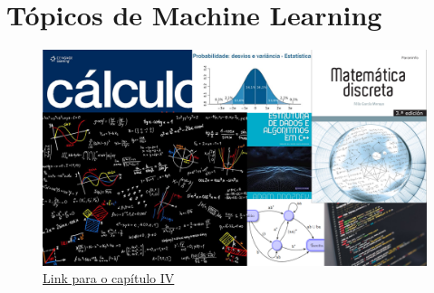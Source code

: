 \documentclass{beamer}
\begin{document}
\section{Tópicos de Machine Learning}

\begin{frame}

    \begin{figure}[ht]
        \centering
        \includegraphics[scale=0.5]{imagens/Capitulo4.png}
        \caption{\href{run:./LDO-Capitulo4.pdf}{Link para o capítulo IV}}
    \end{figure}

\end{frame}
\end{document}
